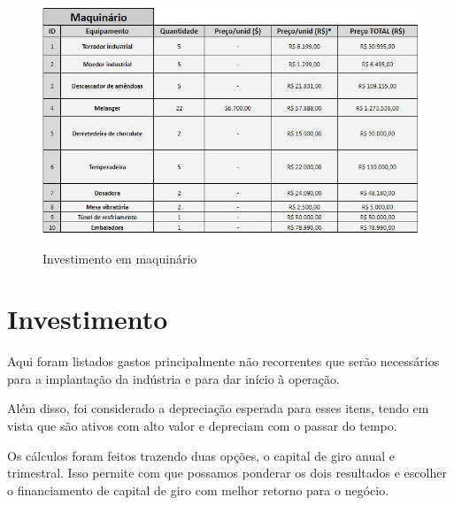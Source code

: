 \documentclass[
	12pt,				%
	openright,			%
	oneside,			%
	a4paper,			%
	english,			%
	french,				%
	spanish,			%
	brazil				%
	]{abntex2}
\begin{document}
\begin{figure}[H]
\begin{center}
\caption{Investimento em maquinário}
\includegraphics[scale=0.6]{5.jpeg} 
\label{-}
\end{center}
\end{figure}

\section{Investimento}

Aqui foram listados gastos principalmente não recorrentes que serão necessários para a implantação da indústria e para dar início à operação. 

Além disso, foi considerado a depreciação esperada para esses itens, tendo em vista que são ativos com alto valor e depreciam com o passar do tempo.

Os cálculos foram feitos trazendo duas opções, o capital de giro anual e trimestral. Isso permite com que possamos ponderar os dois resultados e escolher o financiamento de capital de giro com melhor retorno para o negócio.
\end{document}
